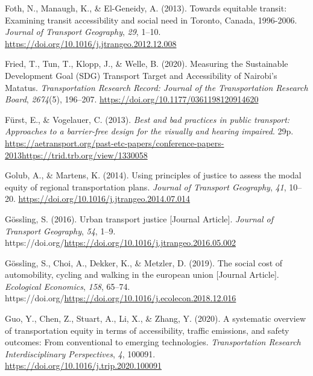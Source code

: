 \documentclass[
  letterpaper,
  DIV=11,
  numbers=noendperiod]{scrartcl}
\newlength{\cslhangindent}
\newenvironment{CSLReferences}[2] %
 {\begin{list}{}{%
  \setlength{\itemindent}{0pt}
  \setlength{\leftmargin}{0pt}
  \setlength{\parsep}{0pt}
  \ifodd #1
   \setlength{\leftmargin}{\cslhangindent}
   \setlength{\itemindent}{-1\cslhangindent}
  \fi
  \setlength{\itemsep}{#2\baselineskip}}}
 {\end{list}}
\begin{document}
\begin{CSLReferences}{1}{0}
Foth, N., Manaugh, K., \& El-Geneidy, A. (2013). Towards equitable
transit: Examining transit accessibility and social need in {Toronto},
{Canada}, 1996-2006. \emph{Journal of Transport Geography}, \emph{29},
1--10. \url{https://doi.org/10.1016/j.jtrangeo.2012.12.008}

Fried, T., Tun, T., Klopp, J., \& Welle, B. (2020). Measuring the
{Sustainable Development Goal} ({SDG}) {Transport Target} and
{Accessibility} of {Nairobi}'s {Matatus}. \emph{Transportation Research
Record: Journal of the Transportation Research Board}, \emph{2674}(5),
196--207. \url{https://doi.org/10.1177/0361198120914620}

Fürst, E., \& Vogelauer, C. (2013). \emph{Best and bad practices in
public transport: Approaches to a barrier-free design for the visually
and hearing impaired}. 29p.
\url{https://aetransport.org/past-etc-papers/conference-papers-2013https://trid.trb.org/view/1330058}

Golub, A., \& Martens, K. (2014). Using principles of justice to assess
the modal equity of regional transportation plans. \emph{Journal of
Transport Geography}, \emph{41}, 10--20.
\url{https://doi.org/10.1016/j.jtrangeo.2014.07.014}

Gössling, S. (2016). Urban transport justice {[}Journal Article{]}.
\emph{Journal of Transport Geography}, \emph{54}, 1--9.
https://doi.org/\url{https://doi.org/10.1016/j.jtrangeo.2016.05.002}

Gössling, S., Choi, A., Dekker, K., \& Metzler, D. (2019). The social
cost of automobility, cycling and walking in the european union
{[}Journal Article{]}. \emph{Ecological Economics}, \emph{158}, 65--74.
https://doi.org/\url{https://doi.org/10.1016/j.ecolecon.2018.12.016}

Guo, Y., Chen, Z., Stuart, A., Li, X., \& Zhang, Y. (2020). A systematic
overview of transportation equity in terms of accessibility, traffic
emissions, and safety outcomes: {From} conventional to emerging
technologies. \emph{Transportation Research Interdisciplinary
Perspectives}, \emph{4}, 100091.
\url{https://doi.org/10.1016/j.trip.2020.100091}


\end{CSLReferences}
\end{document}
